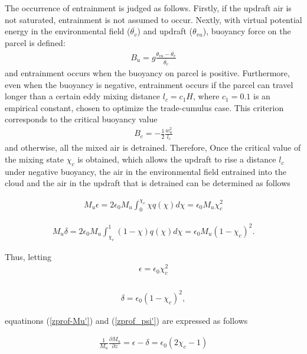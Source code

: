 The occurrence of entrainment is judged as follows. Firstly, if the updraft air is not saturated, entrainment is not assumed to occur. Nextly, with virtual potential energy in the environmental field
(\(\overline{\theta_v}\)) and updraft (\(\theta_{vu}\)), buoyancy force on the parcel is defined: \begin{eqnarray}\label{buoy-u}
    B_u = g\frac{\theta_{vu} - \overline{\theta_{v}}}{ \overline{\theta_v}}\end{eqnarray} and entrainment occurs when the buoyancy on parcel is positive. Furthermore, even when the buoyancy is negative,
entrainment occurs if the parcel can travel longer than a certain eddy mixing distance \(l_c=c_1 H\), where \(c_1=0.1\) is an empirical constant, chosen to optimize the trade-cumulus case. This
criterion corresponds to the critical buoyancy value \begin{eqnarray}\label{buoy-c}
    B_c = -\frac{1}{2}\frac{w_u^2}{l_c}\end{eqnarray} and otherwise, all the mixed air is detrained. Therefore, Once the critical value of the mixing state \(\chi_c\) is obtained, which allows the updraft to rise
a distance \(l_c\) under negative buoyancy, the air in the environmental field entrained into the cloud and the air in the updraft that is detrained can be determined as follows

\begin{eqnarray}
M_u\epsilon=2\epsilon_0 M_u\int_0^{\chi_c}\chi q(\chi) d\chi = \epsilon_0 M_u \chi_c^2 \label{flux-entre}
\end{eqnarray}

\begin{eqnarray}
M_u\delta=2\epsilon_0 M_u\int_{\chi_c}^{1}(1-\chi) q(\chi) d\chi = \epsilon_0 M_u (1-\chi_c)^2. \label{flux-detre}\end{eqnarray}

Thus, letting \begin{eqnarray}
\epsilon=\epsilon_0\chi_c^2 \label{Etilde}\\
\end{eqnarray}

\begin{eqnarray}
\delta=\epsilon_0(1-\chi_c)^2, \label{Dtilde}\end{eqnarray}

equatinons (\ref{zprof-Mu'}) and (\ref{zprof_psi'}) are expressed as follows

\begin{eqnarray}
\frac{1}{M_u}\frac{\partial M_u}{\partial z} = \epsilon - \delta = \epsilon_0(2\chi_c - 1) \label{zprof-Mu-param}
\end{eqnarray}

